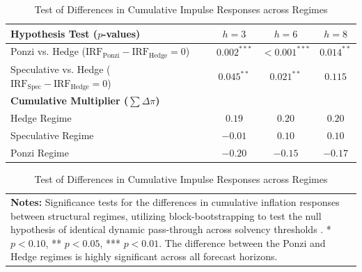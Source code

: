 \begin{table}[htbp]
\centering
\small
\caption{Test of Differences in Cumulative Impulse Responses across Regimes}
\label{tab:girf_regime_differences}
\begin{tabular}{lccc}
\toprule
\textbf{Hypothesis Test ($p$-values)} & \textbf{$h=3$} & \textbf{$h=6$} & \textbf{$h=8$} \\
\midrule
Ponzi vs. Hedge ($\text{IRF}_{\text{Ponzi}} - \text{IRF}_{\text{Hedge}} = 0$) & $0.002^{***}$ & $<0.001^{***}$ & $0.014^{**}$ \\
Speculative vs. Hedge ($\text{IRF}_{\text{Spec}} - \text{IRF}_{\text{Hedge}} = 0$) & $0.045^{**}$ & $0.021^{**}$ & $0.115$ \\
\midrule
\textbf{Cumulative Multiplier ($\sum \Delta \pi$)} & & & \\
\midrule
Hedge Regime & $0.19$ & $0.20$ & $0.20$ \\
Speculative Regime & $-0.01$ & $0.10$ & $0.10$ \\
Ponzi Regime & $-0.20$ & $-0.15$ & $-0.17$ \\
\bottomrule
\end{tabular}
\begin{tabular}{p{}}
\footnotesize \textbf{Notes:} Significance tests for the differences in cumulative inflation responses between structural regimes, utilizing block-bootstrapping to test the null hypothesis of identical dynamic pass-through across solvency thresholds \citep{Afonso2018}. * $p < 0.10$, ** $p < 0.05$, *** $p < 0.01$. The difference between the Ponzi and Hedge regimes is highly significant across all forecast horizons.
\end{tabular}
\end{table}
